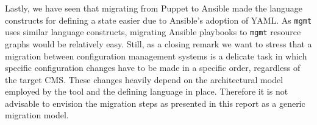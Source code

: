 Lastly, we have seen that migrating from Puppet to Ansible made the language constructs for defining a state easier due to Ansible's adoption of YAML. As \texttt{mgmt} uses similar language constructs, migrating Ansible playbooks to \texttt{mgmt} resource graphs would be relatively easy. Still, as a closing remark we want to stress that a migration between configuration management systems is a delicate task in which specific configuration changes have to be made in a specific order, regardless of the target CMS. These changes  heavily depend on the architectural model employed by the tool and the defining language in place. Therefore it is not advisable to envision the migration steps as presented in this report as a generic migration model. 
